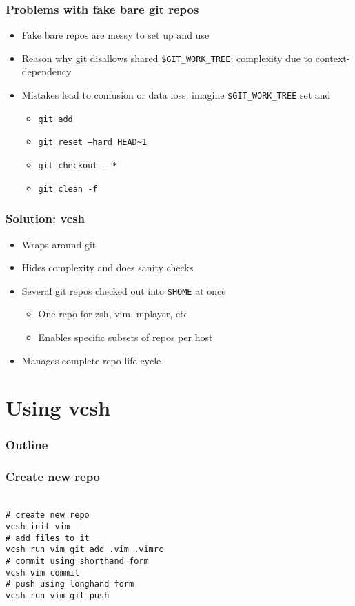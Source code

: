 \documentclass[t]{beamer}
\begin{document}
\begin{frame}
	\frametitle{Problems with fake bare git repos}
	\begin{itemize}
		\item Fake bare repos are messy to set up and use
		\item Reason why git disallows shared \texttt{\$GIT\_WORK\_TREE}: complexity due to context-dependency
		\item Mistakes lead to confusion or data loss; imagine \texttt{\$GIT\_WORK\_TREE} set and
		\begin{itemize}
			\item \texttt{git add}
			\item \texttt{git reset --hard HEAD\~{}1}
			\item \texttt{git checkout -- *}
			\item \texttt{git clean -f}
		\end{itemize}
	\end{itemize}
\end{frame}

\begin{frame}
	\frametitle{Solution: vcsh}
	\begin{itemize}
		\item Wraps around git
		\item Hides complexity and does sanity checks
		\item Several git repos checked out into \texttt{\$HOME} at once
		\begin{itemize}
			\item One repo for zsh, vim, mplayer, etc
			\item Enables specific subsets of repos per host
		\end{itemize}
		\item Manages complete repo life-cycle
	\end{itemize}
\end{frame}

\section{Using vcsh}

\begin{frame}
	\frametitle{Outline}
	\tableofcontents[currentsection]
\end{frame}

\begin{frame}
	\frametitle{Create new repo}
	\texttt{ \\
		\# create new repo \\
		vcsh init vim \\
		\# add files to it \\
		vcsh run vim git add .vim .vimrc \\
		\# commit using shorthand form \\
		vcsh vim commit \\
		\# push using longhand form \\
		vcsh run vim git push
	}
\end{frame}
\end{document}
